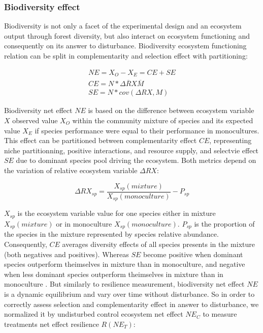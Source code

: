 \documentclass[12pt,]{article}
\theoremstyle{definition}
\theoremstyle{definition}
\theoremstyle{remark}
\begin{document}
\subsubsection{Biodiversity effect}\label{biodiversity-effect}

Biodiversity is not only a facet of the experimental design and an
ecosystem output through forest diversity, but also interact on
ecosystem functioning and consequently on its answer to disturbance.
Biodiversity ecosystem functioning relation can be split in
complementarity and selection effect with \citet{Loreau2001}
partitioning:

\begin{equation}
  \begin{array}{c}
    NE = X_O - X_E = CE + SE \\
    CE = N* \overline{\Delta RX} \overline{M}\\
    SE = N*cov(\Delta RX,M)
  \end{array}
  \label{eq:BiodivPart}
\end{equation}

Biodiversity net effect \(NE\) is based on the difference between
ecosystem variable \(X\) observed value \(X_O\) within the community
mixture of species and its expected value \(X_E\) if species performance
were equal to their performance in monocultures. This effect can be
partitioned between complementarity effect \(CE\), representing niche
partitionning, positive interactions, and resource supply, and selectvie
effect \(SE\) due to dominant species pool driving the ecosystem. Both
metrics depend on the variation of relative ecosystem variable
\(\Delta RX\):

\begin{equation}
  \Delta RX_{sp} = \frac{X_{sp}(mixture)}{X_{sp}(monoculture)} - P_{sp}
  \label{eq:DeltaRY}
\end{equation}

\(X_{sp}\) is the ecosystem variable value for one species either in
mixture \(X_{sp}(mixture)\) or in monoculture \(X_{sp}(monoculture)\).
\(P_{sp}\) is the proportion of the species in the mixture represented
by species relative abundance. Consequently, \(CE\) averages diversity
effects of all species presents in the mixture (both negatives and
positives). Whereas \(SE\) become positive when dominant species
outperform theimselves in mixture than in monoculture, and negative when
less dominant species outperform theimselves in mixture than in
monoculture \citep{Tobner2016}. But similarly to resilience measurement,
biodiversity net effect \(NE\) is a dynamic equilibrium and vary over
time without disturbance. So in order to correctly assess selection and
complementarity effect in answer to disturbance, we normalized it by
undisturbed control ecosystem net effect \(NE_C\) to measure treatments
net effect resilience \(R(NE_T)\):
\end{document}
